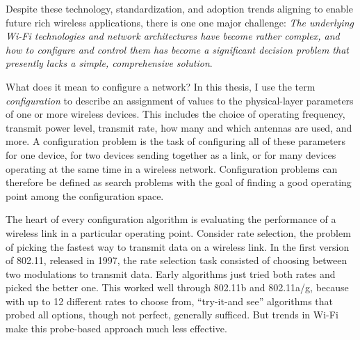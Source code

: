 
Despite these technology, standardization, and adoption trends aligning to enable future rich wireless applications, there is one one major challenge:
\emph{The underlying Wi-Fi technologies and network architectures have become rather complex, and how to configure and control them has become a significant decision problem that presently lacks a simple, comprehensive solution}.

What does it mean to configure a network? In this thesis, I use the term \emph{configuration} to describe an assignment of values to the physical-layer parameters of one or more wireless devices. This includes the choice of operating frequency, transmit power level, transmit rate, how many and which antennas are used, and more. A configuration problem is the task of configuring all of these parameters for one device, for two devices sending together as a link, or for many devices operating at the same time in a wireless network. Configuration problems can therefore be defined as search problems with the goal of finding a good operating point among the configuration space.

The heart of every configuration algorithm is evaluating the performance of a wireless link in a particular operating point. Consider rate selection, the problem of picking the fastest way to transmit data on a wireless link. In the first version of 802.11, released in 1997, the rate selection task consisted of choosing between two modulations to transmit data. Early algorithms just tried both rates and picked the better one. This worked well through 802.11b and 802.11a/g, because with up to 12 different rates to choose from, ``try-it-and see'' algorithms that probed all options, though not perfect, generally sufficed. But trends in Wi-Fi make this probe-based approach much less effective.

